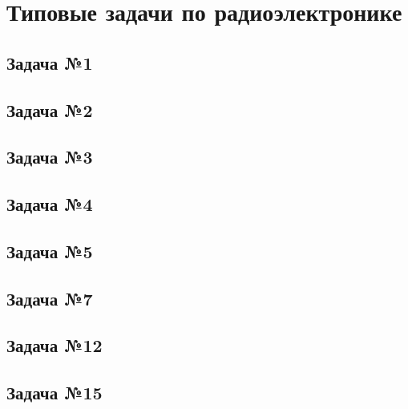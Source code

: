 \documentclass[a4paper,14pt]{extarticle}
\theoremstyle{definition}
\begin{document}
\section{Типовые задачи по радиоэлектронике}

\subsection{Задача №1}

\newpage

\subsection{Задача №2}

\newpage

\subsection{Задача №3}

\newpage

\subsection{Задача №4}

\newpage

\subsection{Задача №5}



\subsection{Задача №7}


\subsection{Задача №12}


\subsection{Задача №15}

\end{document}
